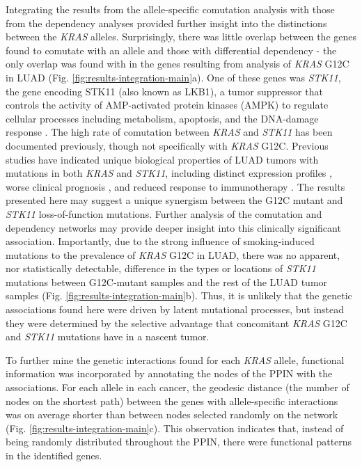 \documentclass[english, 10pt, letterpaper]{article}
\newcommand{\KRAS}{\emph{KRAS}}
\begin{document}
Integrating the results from the allele-specific comutation analysis with those from the dependency analyses provided further insight into the distinctions between the \KRAS{} alleles.
Surprisingly, there was little overlap between the genes found to comutate with an allele and those with differential dependency - the only overlap was found with in the genes resulting from analysis of \KRAS{} G12C in LUAD (Fig. \ref{fig:results-integration-main}a).
One of these genes was \emph{STK11}, the gene encoding STK11 (also known as LKB1), a tumor suppressor that controls the activity of AMP-activated protein kinases (AMPK) to regulate cellular processes including metabolism, apoptosis, and the DNA-damage response \cite{Momcilovic2015TargetingVulnerabilities., Korsse2013TargetingCancer.}.
The high rate of comutation between \KRAS{} and \emph{STK11} has been documented previously, though not specifically with \KRAS{} G12C.
Previous studies have indicated unique biological properties of LUAD tumors with mutations in both \KRAS{} and \emph{STK11}, including distinct expression profiles \cite{Skoulidis2015Co-occurringVulnerabilities.}, worse clinical prognosis \cite{LaFleur2019MutationSTK11, Bange2019ImpactCancer.}, and reduced response to immunotherapy \cite{Skoulidis2018STK11/LKB1Adenocarcinoma.}.
The results presented here may suggest a unique synergism between the G12C mutant and \emph{STK11} loss-of-function mutations.
Further analysis of the comutation and dependency networks may provide deeper insight into this clinically significant association.
Importantly, due to the strong influence of smoking-induced mutations to the prevalence of \KRAS{} G12C in LUAD, there was no apparent, nor statistically detectable, difference in the types or locations of \emph{STK11} mutations between G12C-mutant samples and the rest of the LUAD tumor samples (Fig. \ref{fig:results-integration-main}b).
Thus, it is unlikely that the genetic associations found here were driven by latent mutational processes, but instead they were determined by the selective advantage that concomitant \KRAS{} G12C and \emph{STK11} mutations have in a nascent tumor.

To further mine the genetic interactions found for each \KRAS{} allele, functional information was incorporated by annotating the nodes of the PPIN with the associations.
For each allele in each cancer, the geodesic distance (the number of nodes on the shortest path) between the genes with allele-specific interactions was on average shorter than between nodes selected randomly on the network (Fig. \ref{fig:results-integration-main}c).
This observation indicates that, instead of being randomly distributed throughout the PPIN, there were functional patterns in the identified genes.
\end{document}
